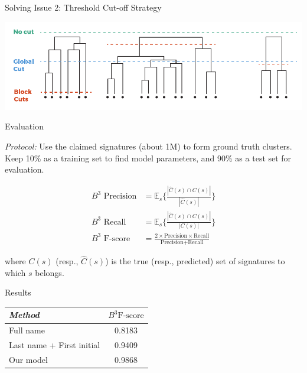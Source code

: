 \documentclass{beamer}
\begin{document}


\begin{frame} {Solving Issue 2: Threshold Cut-off Strategy}

\includegraphics[width=\textwidth]{./figures/fig-cuts.pdf}


\end{frame}



\begin{frame}{Evaluation}

{\it Protocol:} Use the {\color{blue} claimed signatures} (about 1M) to form {\color{blue} ground truth clusters}. Keep 10\% as a training set to find model parameters, and 90\% as a test set for evaluation.

\begin{align}
\text{$B^3$ Precision} &= \mathbb{E}_s \{ \frac{|\hat{C}(s) \cap C(s)|}{|\hat{C}(s)|}  \} \\
\text{$B^3$ Recall} &= \mathbb{E}_s \{ \frac{|\hat{C}(s) \cap C(s)|}{|C(s)|}  \} \\
\text{$B^3$ F-score} &= \frac{2 \times \text{Precision} \times \text{Recall}}{\text{Precision} + \text{Recall}}
\end{align}

where $C(s)$ (resp., $\hat{C}(s)$) is the true (resp., predicted) set of signatures to which $s$ belongs.


\end{frame}


\begin{frame}{Results}

\begin{table}
    \centering
    \begin{tabular}{| l c |}
    \hline
        \textit{Method} & \textit{$B^3 \text{F-score}$}  \\
    \hline
    \hline
    Full name & 0.8183 \\
    Last name + First initial & 0.9409 \\
    \hline
    Our model & {\color{blue} 0.9868} \\
    \hline
    \end{tabular}
\end{table}

\end{frame}
\end{document}
